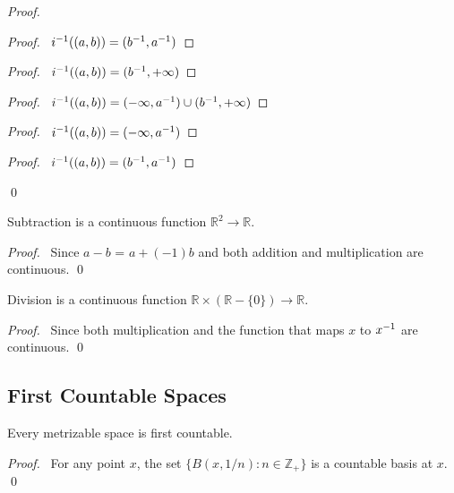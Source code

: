 \begin{proof}
\pf
{}
\begin{proof}
	\pf\ ${i}^{-1}((a,b)) = ({b}^{-1}, {a}^{-1})$
\end{proof}
\begin{proof}
	\pf\ ${i}^{-1}((a,b)) = ({b}^{-1}, + \infty)$
\end{proof}
\begin{proof}
	\pf\ ${i}^{-1}((a,b)) = (-\infty, {a}^{-1}) \cup ({b}^{-1}, +\infty)$
\end{proof}
\begin{proof}
	\pf\ ${i}^{-1}((a,b)) = (-\infty, {a}^{-1})$
\end{proof}
\begin{proof}
	\pf\ ${i}^{-1}((a,b)) = ({b}^{-1}, {a}^{-1})$
\end{proof}
\qed
\end{proof}

\begin{prop}
Subtraction is a continuous function $\mathbb{R}^2 \rightarrow \mathbb{R}$.
\end{prop}

\begin{proof}
\pf\ Since $a-b$ = $a + (-1)b$ and both addition and multiplication are continuous. \qed
\end{proof}

\begin{prop}
Division is a continuous function $\mathbb{R} \times (\mathbb{R} - \{0\}) \rightarrow \mathbb{R}$.
\end{prop}

\begin{proof}
\pf\ Since both multiplication and the function that maps $x$ to ${x}^{-1}$ are continuous. \qed
\end{proof}

\subsection{First Countable Spaces}

\begin{prop}
Every metrizable space is first countable.
\end{prop}

\begin{proof}
\pf\ For any point $x$, the set $\{ B(x, 1/n) : n \in \mathbb{Z}_+ \}$ is a countable basis at $x$. \qed
\end{proof}

